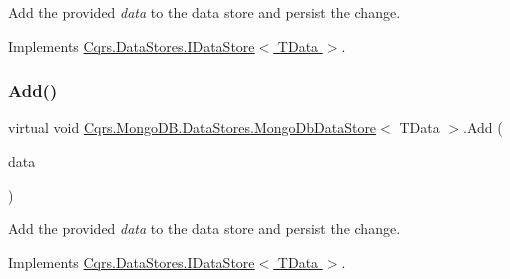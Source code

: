 Add the provided {\itshape data}  to the data store and persist the change. 



Implements \hyperlink{interfaceCqrs_1_1DataStores_1_1IDataStore_a114404daaf37fec9cc5547cd9a17858c_a114404daaf37fec9cc5547cd9a17858c}{Cqrs.\+Data\+Stores.\+I\+Data\+Store$<$ T\+Data $>$}.

\mbox{\label{classCqrs_1_1MongoDB_1_1DataStores_1_1MongoDbDataStore_a709fc1e29d266a7c19a46bd181d03963_a709fc1e29d266a7c19a46bd181d03963}} 
\subsubsection{\texorpdfstring{Add()}{Add()}\hspace{0.1cm}{\footnotesize\ttfamily [2/2]}}
{\footnotesize\ttfamily virtual void \hyperlink{classCqrs_1_1MongoDB_1_1DataStores_1_1MongoDbDataStore}{Cqrs.\+Mongo\+D\+B.\+Data\+Stores.\+Mongo\+Db\+Data\+Store}$<$ T\+Data $>$.Add (\begin{DoxyParamCaption}\item[{I\+Enumerable$<$ T\+Data $>$}]{data }\end{DoxyParamCaption})\hspace{0.3cm}{\ttfamily [virtual]}}



Add the provided {\itshape data}  to the data store and persist the change. 



Implements \hyperlink{interfaceCqrs_1_1DataStores_1_1IDataStore_a906f3f2f80db7a549a4170eca4653e26_a906f3f2f80db7a549a4170eca4653e26}{Cqrs.\+Data\+Stores.\+I\+Data\+Store$<$ T\+Data $>$}.

\mbox{\label{classCqrs_1_1MongoDB_1_1DataStores_1_1MongoDbDataStore_a4650c780f34e320ba39f312e3b04555d_a4650c780f34e320ba39f312e3b04555d}} 

